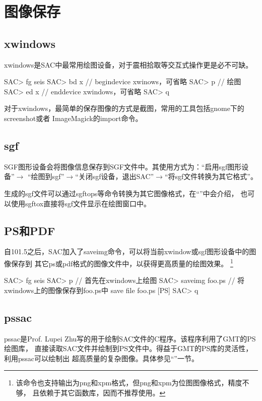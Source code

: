 \section{图像保存}
\label{sec:save-image}

\subsection{xwindows}
xwindows是SAC中最常用绘图设备，对于震相拾取等交互式操作更是必不可缺。
\begin{SACCode}
SAC> fg seis
SAC> bd x       // begindevice xwinows，可省略
SAC> p          // 绘图
SAC> ed x       // enddevice xwindows，可省略
SAC> q
\end{SACCode}

对于xwindows，最简单的保存图像的方式是截图，常用的工具包括gnome下的screenshot或者
ImageMagick的import命令。

\subsection{sgf}
SGF图形设备会将图像信息保存到SGF文件中。其使用方式为：``启用sgf图形设备''$\rightarrow$
``绘图到sgf''$\rightarrow$``关闭sgf设备，退出SAC''$\rightarrow$``将sgf文件转换为其它格式''。

生成的sgf文件可以通过sgftops等命令转换为其它图像格式，在``''中会介绍，
也可以使用sgftox直接将sgf文件显示在绘图窗口中。

\subsection{PS和PDF}
自101.5之后，SAC加入了saveimg命令，可以将当前xwindow或sgf图形设备中的图像保存到
其它ps或pdf格式的图像文件中，以获得更高质量的绘图效果。
\footnote{该命令也支持输出为png和xpm格式，但png和xpm为位图图像格式，精度不够，
且依赖于其它函数库，因而不推荐使用。}

\begin{SACCode}
SAC> fg seis
SAC> p                      // 首先在xwindows上绘图
SAC> saveimg foo.ps         // 将xwindows上的图像保存到foo.ps中
save file foo.ps [PS]
SAC> q
\end{SACCode}

\subsection{pssac}
pssac是Prof. Lupei Zhu写的用于绘制SAC文件的C程序。该程序利用了GMT的PS绘图库，
直接读取SAC文件并绘制到PS文件中。得益于GMT的PS库的灵活性，利用pssac可以绘制出
超高质量的复杂图像。具体参见``''一节。

